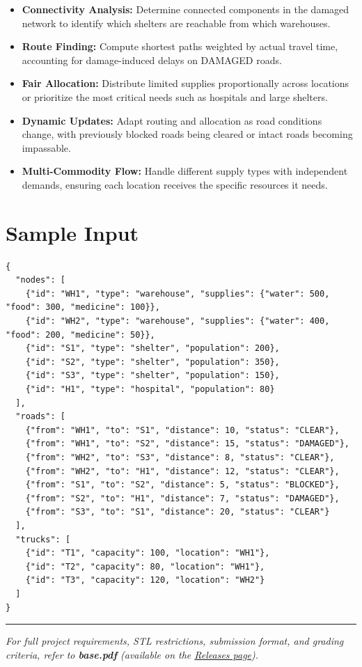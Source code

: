 \begin{itemize}
  \item \textbf{Connectivity Analysis:} Determine connected components in the damaged network to identify which shelters are reachable from which warehouses.
  \item \textbf{Route Finding:} Compute shortest paths weighted by actual travel time, accounting for damage-induced delays on DAMAGED roads.
  \item \textbf{Fair Allocation:} Distribute limited supplies proportionally across locations or prioritize the most critical needs such as hospitals and large shelters.
  \item \textbf{Dynamic Updates:} Adapt routing and allocation as road conditions change, with previously blocked roads being cleared or intact roads becoming impassable.
  \item \textbf{Multi-Commodity Flow:} Handle different supply types with independent demands, ensuring each location receives the specific resources it needs.
\end{itemize}

\section{Sample Input}

\begin{lstlisting}[style=json, caption={data/input\_sample.json}]
{
  "nodes": [
    {"id": "WH1", "type": "warehouse", "supplies": {"water": 500, "food": 300, "medicine": 100}},
    {"id": "WH2", "type": "warehouse", "supplies": {"water": 400, "food": 200, "medicine": 50}},
    {"id": "S1", "type": "shelter", "population": 200},
    {"id": "S2", "type": "shelter", "population": 350},
    {"id": "S3", "type": "shelter", "population": 150},
    {"id": "H1", "type": "hospital", "population": 80}
  ],
  "roads": [
    {"from": "WH1", "to": "S1", "distance": 10, "status": "CLEAR"},
    {"from": "WH1", "to": "S2", "distance": 15, "status": "DAMAGED"},
    {"from": "WH2", "to": "S3", "distance": 8, "status": "CLEAR"},
    {"from": "WH2", "to": "H1", "distance": 12, "status": "CLEAR"},
    {"from": "S1", "to": "S2", "distance": 5, "status": "BLOCKED"},
    {"from": "S2", "to": "H1", "distance": 7, "status": "DAMAGED"},
    {"from": "S3", "to": "S1", "distance": 20, "status": "CLEAR"}
  ],
  "trucks": [
    {"id": "T1", "capacity": 100, "location": "WH1"},
    {"id": "T2", "capacity": 80, "location": "WH1"},
    {"id": "T3", "capacity": 120, "location": "WH2"}
  ]
}
\end{lstlisting}

\vfill
\noindent\rule{\textwidth}{0.4pt}
{\small\textit{For full project requirements, STL restrictions, submission format, and grading criteria, refer to \textbf{base.pdf} (available on the \href{https://github.com/BestSithInEU/cse211-term-projects/releases}{Releases page}).}}
